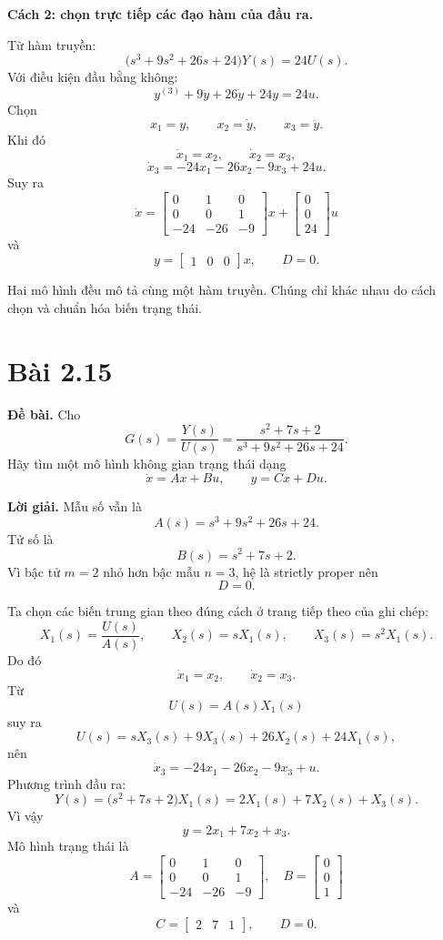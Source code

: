 \documentclass[11pt,a4paper]{article}
\newcommand{\baitap}[1]{%
  \Needspace{4\baselineskip}%
  \section*{Bài #1}%
}
\newcommand{\debai}{\par\noindent\textbf{Đề bài.}\enspace}
\newcommand{\loigiai}{\par\smallskip\noindent\textbf{Lời giải.}\enspace}
\begin{document}
\textbf{Cách 2: chọn trực tiếp các đạo hàm của đầu ra.}

Từ hàm truyền:
\[
\big(s^3+9s^2+26s+24\big)Y(s)=24U(s).
\]
Với điều kiện đầu bằng không:
\[
y^{(3)}+9\ddot y+26\dot y+24y=24u.
\]
Chọn
\[
x_1=y,\qquad x_2=\dot y,\qquad x_3=\ddot y.
\]
Khi đó
\[
\dot x_1=x_2,\qquad
\dot x_2=x_3,
\]
\[
\dot x_3=-24x_1-26x_2-9x_3+24u.
\]
Suy ra
\[
\boxed{
\dot x=
\begin{bmatrix}
0&1&0\\
0&0&1\\
-24&-26&-9
\end{bmatrix}x+
\begin{bmatrix}
0\\0\\24
\end{bmatrix}u
}
\]
và
\[
\boxed{
y=
\begin{bmatrix}
1&0&0
\end{bmatrix}x,\qquad D=0.
}
\]

Hai mô hình đều mô tả cùng một hàm truyền. Chúng chỉ khác nhau do cách chọn và chuẩn hóa biến trạng thái.

\baitap{2.15}
\debai
Cho
\[
G(s)=\frac{Y(s)}{U(s)}
=\frac{s^2+7s+2}{s^3+9s^2+26s+24}.
\]
Hãy tìm một mô hình không gian trạng thái dạng
\[
\dot x=Ax+Bu,\qquad y=Cx+Du.
\]

\loigiai
Mẫu số vẫn là
\[
A(s)=s^3+9s^2+26s+24.
\]
Tử số là
\[
B(s)=s^2+7s+2.
\]
Vì bậc tử $m=2$ nhỏ hơn bậc mẫu $n=3$, hệ là strictly proper nên
\[
D=0.
\]

Ta chọn các biến trung gian theo đúng cách ở trang tiếp theo của ghi chép:
\[
X_1(s)=\frac{U(s)}{A(s)},\qquad
X_2(s)=sX_1(s),\qquad
X_3(s)=s^2X_1(s).
\]
Do đó
\[
\dot x_1=x_2,\qquad
\dot x_2=x_3.
\]
Từ
\[
U(s)=A(s)X_1(s)
\]
suy ra
\[
U(s)=sX_3(s)+9X_3(s)+26X_2(s)+24X_1(s),
\]
nên
\[
\dot x_3=-24x_1-26x_2-9x_3+u.
\]
Phương trình đầu ra:
\[
Y(s)=\big(s^2+7s+2\big)X_1(s)
=2X_1(s)+7X_2(s)+X_3(s).
\]
Vì vậy
\[
y=2x_1+7x_2+x_3.
\]
Mô hình trạng thái là
\[
\boxed{
A=
\begin{bmatrix}
0&1&0\\
0&0&1\\
-24&-26&-9
\end{bmatrix},\quad
B=
\begin{bmatrix}
0\\0\\1
\end{bmatrix}
}
\]
và
\[
\boxed{
C=
\begin{bmatrix}
2&7&1
\end{bmatrix},\qquad D=0.
}
\]
\end{document}
